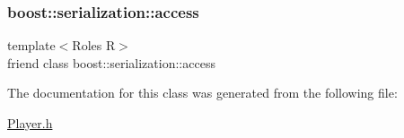 \subsubsection{\texorpdfstring{boost\+::serialization\+::access}{boost::serialization::access}}
{\footnotesize\ttfamily template$<$Roles R$>$ \\
friend class boost\+::serialization\+::access\hspace{0.3cm}{\ttfamily [friend]}}



The documentation for this class was generated from the following file\+:\begin{DoxyCompactItemize}
\item 
\hyperlink{_player_8h}{Player.\+h}\end{DoxyCompactItemize}
